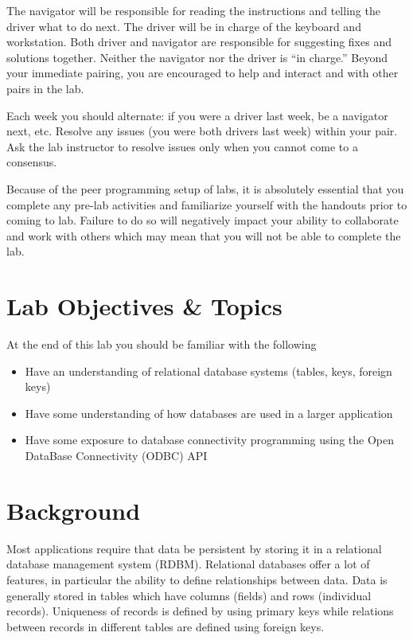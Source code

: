 \documentclass[12pt]{scrartcl}
\begin{document}
The navigator will be responsible for reading the instructions and
telling the driver what to do next.  The driver will be in charge of the
keyboard and workstation.  Both driver and navigator are responsible
for suggesting fixes and solutions together.  Neither the navigator
nor the driver is ``in charge.''  Beyond your immediate pairing, you
are encouraged to help and interact and with other pairs in the lab.

Each week you should alternate: if you were a driver last week, 
be a navigator next, etc.  Resolve any issues (you were both drivers
last week) within your pair.  Ask the lab instructor to resolve issues
only when you cannot come to a consensus.  

Because of the peer programming setup of labs, it is absolutely 
essential that you complete any pre-lab activities and familiarize
yourself with the handouts prior to coming to lab.  Failure to do
so will negatively impact your ability to collaborate and work with 
others which may mean that you will not be able to complete the
lab.  


\section{Lab Objectives \& Topics}
At the end of this lab you should be familiar with the following
\begin{itemize}
  \item Have an understanding of relational database systems (tables, 
  	keys, foreign keys) 
  \item Have some understanding of how databases are used in a 
	larger application
  \item Have some exposure to database connectivity programming 
	using the Open DataBase Connectivity (ODBC) API
\end{itemize}

\section{Background}

Most applications require that data be persistent by storing it in 
a relational database management system (RDBM).  Relational 
databases offer a lot of features, in particular the ability to define 
relationships between data.  Data is generally stored in tables 
which have columns (fields) and rows (individual records).  
Uniqueness of records is defined by using primary keys while 
relations between records in different tables are defined using 
foreign keys.
\end{document}
